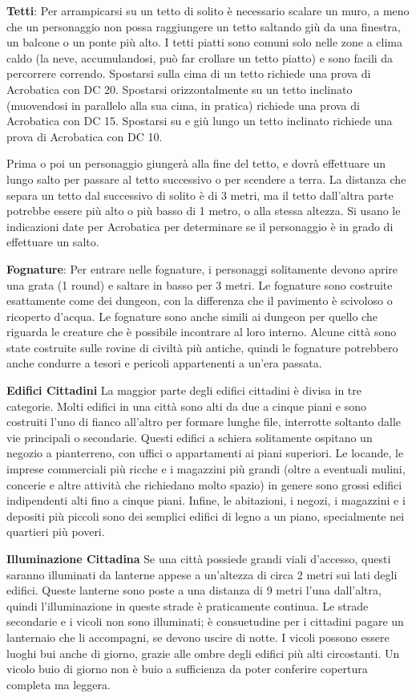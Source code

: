 \documentclass[a4paper,twoside,openany]{book}
\begin{document}
\begin{multicols}{2}
\textbf{Tetti}: Per arrampicarsi su un tetto di solito è necessario scalare un muro, a meno che un personaggio non possa raggiungere un tetto saltando giù da una finestra, un balcone o un ponte più alto. I tetti piatti sono comuni solo nelle zone a clima caldo (la neve, accumulandosi, può far crollare un tetto piatto) e sono facili da percorrere correndo. Spostarsi sulla cima di un tetto richiede una prova di Acrobatica con DC 20. Spostarsi orizzontalmente su un tetto inclinato (muovendosi in parallelo alla sua cima, in pratica) richiede una prova di Acrobatica con DC 15. Spostarsi su e giù lungo un tetto inclinato richiede una prova di Acrobatica con DC 10.

Prima o poi un personaggio giungerà alla fine del tetto, e dovrà effettuare un lungo salto per passare al tetto successivo o per scendere a terra. La distanza che separa un tetto dal successivo di solito è di 3 metri, ma il tetto dall'altra parte potrebbe essere più alto o più basso di 1 metro, o alla stessa altezza. Si usano le indicazioni date per Acrobatica per determinare se il personaggio è in grado di effettuare un salto.

\textbf{Fognature}: Per entrare nelle fognature, i personaggi solitamente devono aprire una grata (1 round) e saltare in basso per 3 metri. Le fognature sono costruite esattamente come dei dungeon, con la differenza che il pavimento è scivoloso o ricoperto d'acqua. Le fognature sono anche simili ai dungeon per quello che riguarda le creature che è possibile incontrare al loro interno. Alcune città sono state costruite sulle rovine di civiltà più antiche, quindi le fognature potrebbero anche condurre a tesori e pericoli appartenenti a un'era passata.

\textbf{Edifici Cittadini}
La maggior parte degli edifici cittadini è divisa in tre categorie. Molti edifici in una città sono alti da due a cinque piani e sono costruiti l'uno di fianco all'altro per formare lunghe file, interrotte soltanto dalle vie principali o secondarie. Questi edifici a schiera solitamente ospitano un negozio a pianterreno, con uffici o appartamenti ai piani superiori. Le locande, le imprese commerciali più ricche e i magazzini più grandi (oltre a eventuali mulini, concerie e altre attività che richiedano molto spazio) in genere sono grossi edifici indipendenti alti fino a cinque piani.
Infine, le abitazioni, i negozi, i magazzini e i depositi più piccoli sono dei semplici edifici di legno a un piano, specialmente nei quartieri più poveri.

\textbf{Illuminazione Cittadina}
Se una città possiede grandi viali d'accesso, questi saranno illuminati da lanterne appese a un'altezza di circa 2 metri sui lati degli edifici. Queste lanterne sono poste a una distanza di 9 metri l'una dall'altra, quindi l'illuminazione in queste strade è praticamente continua. Le strade secondarie e i vicoli non sono illuminati; è consuetudine per i cittadini pagare un lanternaio che li accompagni, se devono uscire di notte. I vicoli possono essere luoghi bui anche di giorno, grazie alle ombre degli edifici più alti circostanti. Un vicolo buio di giorno non è buio a sufficienza da poter conferire copertura completa ma leggera.



\end{multicols}
\end{document}
